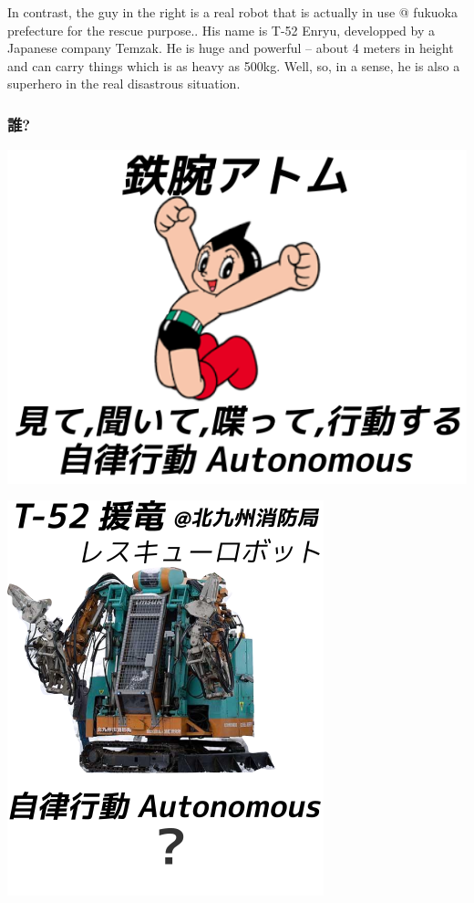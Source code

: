 \begin{resume}
In contrast, the guy in the right is a real robot that is actually in use @ fukuoka prefecture for the rescue purpose..
His name is T-52 Enryu, developped by a Japanese company Temzak.
He is huge and powerful -- about 4 meters in height and can carry things which is as heavy as 500kg.
Well, so, in a sense, he is also a superhero in the real disastrous situation.
\end{resume}

\subsubsection{誰?}
\label{sec-1-1-4}

\begin{container-fluid}
\begin{row-fluid}
\begin{span6}
\includegraphics{img/astro/final.png}
\end{span6}
\begin{span6}
\includegraphics{img/rescue/3.png}
\end{span6}
\end{row-fluid}
\end{container-fluid}

